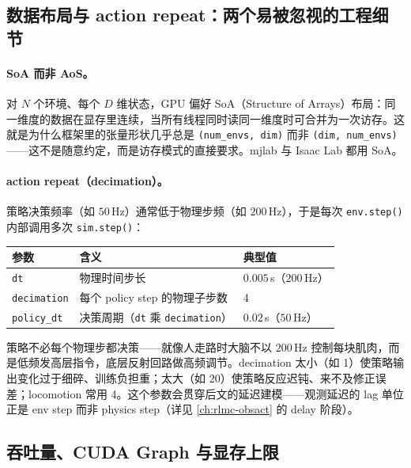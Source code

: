 \subsection{数据布局与 action repeat：两个易被忽视的工程细节}

\paragraph{SoA 而非 AoS。}对 $N$ 个环境、每个 $D$ 维状态，GPU 偏好 SoA（Structure of Arrays）布局：同一维度的数据在显存里连续，当所有线程同时读同一维度时可合并为一次访存。这就是为什么框架里的张量形状几乎总是 \verb|(num_envs, dim)| 而非 \verb|(dim, num_envs)|——这不是随意约定，而是访存模式的直接要求。mjlab 与 Isaac Lab 都用 SoA。

\paragraph{action repeat（decimation）。}策略决策频率（如 $50\,$Hz）通常低于物理步频（如 $200\,$Hz），于是每次 \verb|env.step()| 内部调用多次 \verb|sim.step()|：

\begin{center}
\small
\begin{tabular}{@{}lll@{}}
\toprule
参数 & 含义 & 典型值 \\
\midrule
\verb|dt| & 物理时间步长 & $0.005\,$s（$200\,$Hz） \\
\verb|decimation| & 每个 policy step 的物理子步数 & 4 \\
\verb|policy_dt| & 决策周期（\verb|dt| 乘 \verb|decimation|） & $0.02\,$s（$50\,$Hz） \\
\bottomrule
\end{tabular}
\end{center}

\begin{insight}\label{ins:rlmc-eco-decimation}
策略不必每个物理步都决策——就像人走路时大脑不以 $200\,$Hz 控制每块肌肉，而是低频发高层指令，底层反射回路做高频调节。decimation 太小（如 1）使策略输出变化过于细碎、训练负担重；太大（如 20）使策略反应迟钝、来不及修正误差；locomotion 常用 4。这个参数会贯穿后文的延迟建模——观测延迟的 lag 单位正是 env step 而非 physics step（详见 \cref{ch:rlmc-obsact} 的 delay 阶段）。
\end{insight}

\subsection{吞吐量、CUDA Graph 与显存上限}

